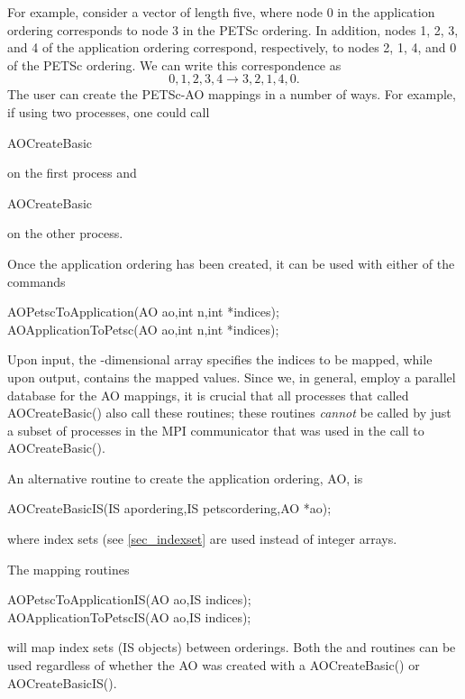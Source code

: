 For example, consider a vector of length five, where node 0 in the application ordering
corresponds to node 3 in the PETSc ordering.  In addition, nodes 1, 2, 3, and 4 of
the application ordering correspond, respectively, to nodes 2, 1, 4, and 0 of
the PETSc ordering.
We can write this correspondence as
\[
 { 0, 1, 2, 3, 4 }  \rightarrow  { 3, 2, 1, 4, 0 }. 
\]
The user can create the PETSc-AO mappings in a number of ways.  For example,
if using two processes, one could call
\begin{tabbing}
  AOCreateBasic
\end{tabbing}
on the first process and 
\begin{tabbing}
 AOCreateBasic
\end{tabbing}
on the other process.

Once the application ordering has been created, it can be used
with either of the commands
\begin{tabbing}
  AOPetscToApplication(AO ao,int n,int *indices);\\
  AOApplicationToPetsc(AO ao,int n,int *indices);
\end{tabbing}
Upon input, the -dimensional array  specifies 
the indices to be mapped, while upon output,  contains
the mapped values.
 
Since we, in general, employ a parallel database for the
AO mappings, it is crucial that all processes that
called AOCreateBasic() also call these routines; these
routines {\em cannot} be called by just a subset of processes
in the MPI communicator that was used in the call to AOCreateBasic().

An alternative routine to create the application ordering, AO, is 
\begin{tabbing}
  AOCreateBasicIS(IS apordering,IS petscordering,AO *ao);
\end{tabbing}
where index sets (see \ref{sec_indexset} are used instead of integer arrays. 

The 
mapping routines 
\begin{tabbing}
  AOPetscToApplicationIS(AO ao,IS indices);\\
  AOApplicationToPetscIS(AO ao,IS indices);
\end{tabbing}
 
will map index sets (IS objects) between orderings. Both the  and 
 routines can be used regardless of whether the AO was 
created with a AOCreateBasic() or AOCreateBasicIS().

